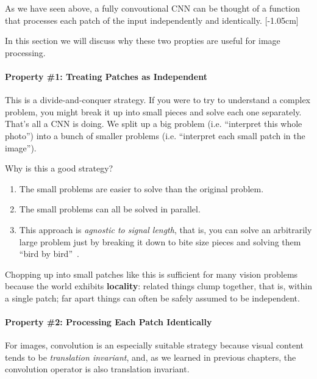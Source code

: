 As we have seen above, a fully convoutional CNN can be thought of a function that processes each patch of the input independently and identically. [-1.05cm]%


In this section we will discuss why these two propties are useful for image processing.

\paragraph*{Property \#1: Treating Patches as Independent}
This is a divide-and-conquer strategy. If you were to try to understand a complex problem, you might break it up into small pieces and solve each one separately. That's all a CNN is doing. We split up a big problem (i.e. ``interpret this whole photo'') into a bunch of smaller problems (i.e. ``interpret each small patch in the image'').

Why is this a good strategy?
\begin{enumerate}
    \item The small problems are easier to solve than the original problem.
    \item The small problems can all be solved in parallel.
    \item This approach is \textit{agnostic to signal length}, that is, you can solve an arbitrarily large problem just by breaking it down to bite size pieces and solving them ``bird by bird''~\cite{lamott1980}.
\end{enumerate}

Chopping up into small patches like this is sufficient for many vision problems because the world exhibits {\bf locality}: related things clump together, that is, within a single patch; far apart things can often be safely assumed to be independent.


\paragraph*{Property \#2: Processing Each Patch Identically}
For images, convolution is an especially suitable strategy because visual content tends to be \textit{translation invariant}, and, as we learned in previous chapters, the convolution operator is also translation invariant.

